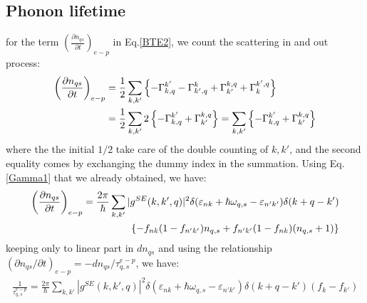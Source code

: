 \documentclass{article}
\newcommand{\pfrac}[2]{\frac{\partial #1}{\partial #2}}
\begin{document}
\subsection{Phonon lifetime}
for the term $\left(\pfrac{n_{qs}}{t}\right)_{e-p} $ in Eq.\ref{BTE2}, we count the scattering in and out process:
\begin{align}
    \left(\pfrac{n_{qs}}{t}\right)_{e-p} &= \frac{1}{2} \sum_{k,k'} 
        \left\{ - \Gamma_{k,q}^{k'} -\Gamma_{k',q}^{k} + \Gamma_{k'}^{k,q} + \Gamma_{k}^{k',q}  \right\}  \notag \\
    &= \frac{1}{2} \sum_{k,k'} 2  \left\{ - \Gamma_{k,q}^{k'} + \Gamma_{k'}^{k,q}  \right\}  
        = \sum_{k,k'} \left\{ - \Gamma_{k,q}^{k'} + \Gamma_{k'}^{k,q}  \right\}
\end{align}
where the the initial $1/2$ take care of the double counting of $k, k'$, and 
the second equality comes by exchanging the dummy index in the summation. 
Using Eq.\ref{Gamma1} that we already obtained, we have:
\begin{align}
    \left(\pfrac{n_{qs}}{t}\right)_{e-p} = \frac{2\pi}{\hbar} \sum_{k,k'}|g^{SE}(k,k',q)|^2 \delta(\varepsilon_{nk} + \hbar\omega_{q,s} - \varepsilon_{n'k'}) \delta(k+q-k') \notag \\
    \left\{ -f_{nk} (1-f_{n'k'}) n_{q,s} + f_{n'k'} (1-f_{nk}) (n_{q,s}+1) \right\}
\end{align}
keeping only to linear part in $dn_{qs}$ and using the relationship $\left(\partial n_{qs} / \partial t\right)_{e-p} = -dn_{qs} / \tau_{q,s}^{e-p}$, we have:
\begin{align}
    \frac{1}{\tau_{q,s}^{e-p}} = \frac{2\pi}{\hbar} \sum_{k,k'}|g^{SE}(k,k',q)|^2 \delta(\varepsilon_{nk} + \hbar\omega_{q,s} - \varepsilon_{n'k'}) \delta(k+q-k') (f_k - f_{k'})
\end{align}
\end{document}
